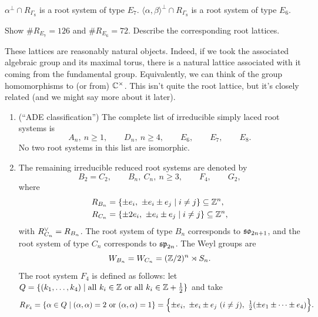 \begin{enumerate}
    \begin{definition}
    $\alpha^\perp \cap R_{\Gamma_8}$ is a root system of type $E_7$.
    $\langle \alpha, \beta\rangle^\perp \cap R_{\Gamma_8}$ is a root system of
    type $E_6$.
    \end{definition}

    \begin{exercise}
    Show $\#R_{E_7} = 126$ and $\#R_{E_6} = 72$. Describe the corresponding
    root lattices.
    \end{exercise}

    \begin{remark}
    These lattices are reasonably natural objects. Indeed, if we took the
    associated algebraic group and its maximal torus, there is a natural
    lattice associated with it coming from the fundamental group.
    Equivalently, we can think of the group homomorphisms to (or from)
    $\mathbb{C}^\times$. This isn't quite the root lattice, but it's closely related
    (and we might say more about it later).
    \end{remark}
\end{enumerate}

\begin{theorem}\leavevmode
\begin{enumerate}
  \item (``ADE classification'') The complete list of irreducible simply laced
    root systems is
    \[
      A_n,\ n \geq 1, \qquad D_n,\ n \geq 4, \qquad E_6, \qquad E_7, \qquad E_8.
    \]
    No two root systems in this list are isomorphic.
  \item The remaining irreducible reduced root systems are denoted by
    \[
      B_2 = C_2, \qquad B_n,\ C_n,\ n \geq 3, \qquad F_4, \qquad G_2,
    \]
    where
    \begin{align*}
      R_{B_n} &= \{\pm e_i,\ \pm e_i \pm e_j \mid i \neq j\} \subseteq \mathbb{Z}^n,\\
      R_{C_n} &= \{\pm 2e_i,\ \pm e_i \pm e_j \mid i \neq j\} \subseteq \mathbb{Z}^n,
    \end{align*}
    with $R_{C_n}^{\vee} = R_{B_n}$. The root system of type $B_n$ corresponds to
    $\mathfrak{so}_{2n+1}$, and the root system of type $C_n$ corresponds to
    $\mathfrak{sp}_{2n}$. The Weyl groups are
    \[
      W_{B_n} = W_{C_n} = (\mathbb{Z}/2)^n \rtimes S_n.
    \]
    The root system $F_4$ is defined as follows: let
    $Q = \{(k_1, \dots, k_4) \mid \text{all } k_i \in \mathbb{Z} \text{ or all } k_i \in \mathbb{Z} + \frac12\}$
    and take
    \[
      R_{F_4} = \{\alpha \in Q \mid (\alpha, \alpha) = 2 \text{ or } (\alpha, \alpha) = 1\}
        = \Bigl\{\pm e_i,\ \pm e_i \pm e_j\ (i \neq j),\
          \tfrac12(\pm e_1 \pm \dots \pm e_4)\Bigr\}.
    \]
\end{enumerate}
\end{theorem}


